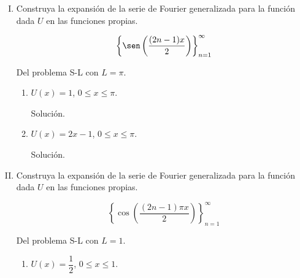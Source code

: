 \documentclass[fleqn]{article}
\begin{document}
\begin{enumerate}[I.]
		
		\bfseries
			
		\item Construya la expansión de la serie de Fourier generalizada para la función dada $U$ en las funciones propias.
		
		\begin{equation*}
			\left\lbrace \sen \left( \dfrac{(2n - 1) x}{2} \right) \right\rbrace_{n=1}^{\infty}
		\end{equation*}

		Del problema S-L con $ L = \pi $.
		
		\begin{enumerate}
			\item $ U(x) = 1 $, $ 0 \leq x \leq \pi $.
			
			Solución.
			
			\normalfont




			\bfseries
			
			\item $ U(x) = 2x - 1 $, $ 0 \leq x \leq \pi $.
			
			Solución.
			
			\normalfont



		\end{enumerate}


		\bfseries
			
		\item Construya la expansión de la serie de Fourier generalizada para la función dada $U$ en las funciones propias.
		
		\begin{equation*}
			\left\lbrace \cos \left( \dfrac{(2n - 1) \pi x}{2} \right) \right\rbrace_{n=1}^{\infty}
		\end{equation*}

		Del problema S-L con $ L = 1 $.
		
		\begin{enumerate}
			\item $ U(x) = \dfrac{1}{2} $, $ 0 \leq x \leq 1 $.
			

\end{enumerate}
\end{enumerate}
\end{document}

